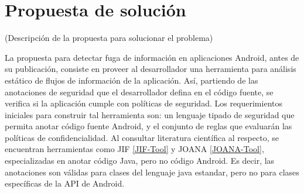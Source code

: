 \section{Propuesta de solución}
\label{sec:propuesta-sol} 
(Descripción de la propuesta para solucionar el problema)

La propuesta para detectar fuga de información en aplicaciones Android, antes de
su publicación, consiste en proveer al desarrollador una herramienta para
análisis estático de flujos de información de la aplicación. Así, partiendo de
las anotaciones de seguridad que el desarrollador defina en el código fuente, se
verifica si la aplicación cumple con políticas de seguridad.\newline
Los requerimientos iniciales para construir tal herramienta son: un lenguaje
tipado de seguridad que permita anotar código fuente Android, y el conjunto de
reglas que evaluarán las políticas de confidencialidad.\newline 
Al consultar literatura científica al respecto, se encuentran herramientas como
JIF \ref{JIF-Tool} y JOANA \ref{JOANA-Tool}, especializadas en anotar código
Java, pero no código Android. Es decir, las anotaciones son válidas para clases
del lenguaje java estandar, pero no para clases específicas de la API de Android.

